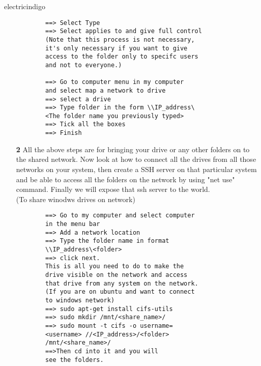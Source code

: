 \documentclass[12pt]{article}
\begin{document}
\begin{mybox}{electricindigo}{}
	\begin{itemize}
		\item[] \begin{lstlisting}
		==> Select Type 
		==> Select applies to and give full control
		(Note that this process is not necessary,
		it's only necessary if you want to give 
		access to the folder only to specifc users 
		and not to everyone.)
		
		==> Go to computer menu in my computer 
		and select map a network to drive 
		==> select a drive 
		==> Type folder in the form \\IP_address\
		<The folder name you previously typed> 
		==> Tick all the boxes 
		==> Finish
		\end{lstlisting} 
		\item[\textbf{2}] All the above steps are for bringing your drive or any other folders on to the shared 
		network. Now look at how to connect all 
		the drives from all those networks on your 
		system, then create a SSH server on that particular system and be able to access all the folders on the
		network by using "net use" command. 
		Finally we will expose that ssh server 
		to the world.\\
		(To share winodws drives on network)
		\begin{lstlisting}
		==> Go to my computer and select computer 
		in the menu bar 
		==> Add a network location 
		==> Type the folder name in format
		\\IP_address\<folder> 
		==> click next.
		This is all you need to do to make the 
		drive visible on the network and access
		that drive from any system on the network.
		(If you are on ubuntu and want to connect 
		to windows network)
		==> sudo apt-get install cifs-utils
		==> sudo mkdir /mnt/<share_name>/ 
		==> sudo mount -t cifs -o username=
		<username> //<IP_address>/<folder> 
		/mnt/<share_name>/
		==>Then cd into it and you will 
		see the folders.
		\end{lstlisting}
		
	
		
	\end{itemize}	
\end{mybox}
\end{document}
